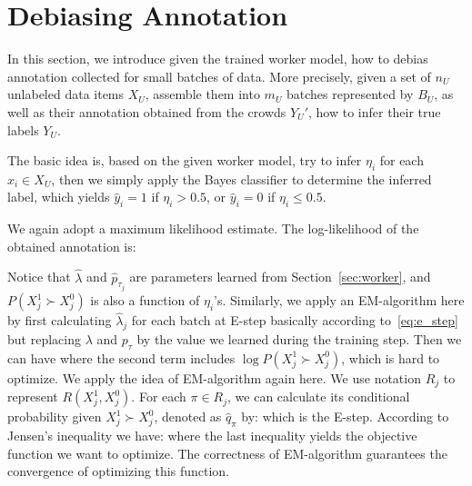 \section{Debiasing Annotation}
\label{sec:debias}

In this section, we introduce given the trained worker model,
how to debias annotation collected for small batches of data.
More precisely, given a set of $n_U$ unlabeled data items $X_U$,
assemble them into $m_U$ batches represented by $B_U$,
as well as their annotation obtained from the crowds $Y_U'$,
how to infer their true labels $Y_U$.

The basic idea is, based on the given worker model,
try to infer $\eta_i$ for each $x_i \in X_U$,
then we simply apply the Bayes classifier to determine the inferred label,
which yields $\hat{y}_i = 1$ if $\eta_i > 0.5$, or $\hat{y}_i = 0$ if $\eta_i \leq 0.5$.

We again adopt a maximum likelihood estimate.
The log-likelihood of the obtained annotation is:
%

Notice that $\hat{\lambda}$ and $\hat{p}_{\tau_j}$ are parameters learned from Section~\ref{sec:worker},
and $P(X_{j}^1 \succ X_{j}^0)$ is also a function of $\eta_{i}$'s.
Similarly, we apply an EM-algorithm here
by first calculating $\hat{\lambda}_j$ for each batch at E-step basically according to~\eqref{eq:e_step}
but replacing $\lambda$ and $p_{\tau}$ by the value we learned during the training step.
Then we can have
%
where the second term includes $\log P(X_{j}^1 \succ X_{j}^0)$, which is hard to optimize.
We apply the idea of EM-algorithm again here.
We use notation $R_j$ to represent $R(X_{j}^1, X_{j}^0)$.
For each $\pi \in R_j$, we can calculate its conditional probability given $X_{j}^1 \succ X_{j}^0$, denoted as $\hat{q}_{\pi}$ by:
%
which is the E-step.
According to Jensen's inequality we have:
%
where the last inequality yields the objective function we want to optimize.
The correctness of EM-algorithm guarantees the convergence of optimizing this function.


